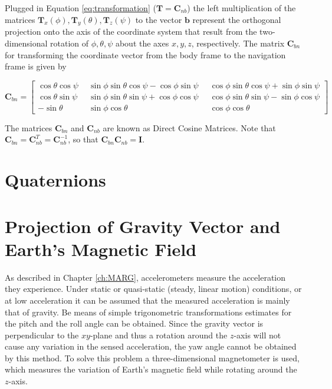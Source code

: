 \noindent
Plugged in Equation \ref{eq:transformation} ($\mathbf{T} = \mathbf{C}_{nb}$) the left multiplication of the matrices $\mathbf{T}_x(\phi), \mathbf{T}_y(\theta), \mathbf{T}_z(\psi)$ to the vector $\mathbf{b}$ represent the orthogonal projection onto the axis of the coordinate system that result from the two-dimensional rotation of $\phi, \theta, \psi$ about the axes $x, y, z$, respectively. The matrix $\mathbf{C}_{bn}$ for transforming the coordinate vector from the body frame to the navigation frame is given by

\begin{equation}
\mathbf{C}_{bn} = {\left[\begin{smallmatrix}
   \cos \theta \cos \psi \; &
    \sin \phi \sin \theta \cos \psi - \cos \phi \sin \psi \; &
    \cos \phi \sin \theta \cos \psi + \sin \phi \sin \psi \\
    \cos \theta \sin \psi \;\; &
    \sin \phi \sin \theta \sin \psi + \cos \phi \cos \psi \;\; &
    \cos \phi \sin \theta \sin \psi - \sin \phi \cos \psi \\
    -\sin \theta \;\; &
    \sin \phi \cos \theta \;\; &
    \cos \phi \cos \theta
  \end{smallmatrix}\right]}
\end{equation}

\noindent
The matrices $\mathbf{C}_{bn}$ and $\mathbf{C}_{nb}$ are known as Direct Cosine Matrices. Note that $\mathbf{C}_{bn} = \mathbf{C}^T_{nb} = \mathbf{C}^{-1}_{nb}$, so that $\mathbf{C}^{ }_{bn} \mathbf{C}_{nb} = \mathbf{I}$.  

\section{Quaternions}

\blindtext

\section{Projection of Gravity Vector and Earth's Magnetic Field}

As described in Chapter \ref{ch:MARG}, accelerometers measure the acceleration they experience. Under static or quasi-static (steady, linear motion) conditions, or at low acceleration it can be assumed that the measured acceleration is mainly that of gravity. Be means of simple trigonometric transformations estimates for the pitch and the roll angle can be obtained. Since the gravity vector is perpendicular to the $xy$-plane and thus a rotation around the $z$-axis will not cause any variation in the sensed acceleration, the yaw angle cannot be obtained by this method. To solve this problem a three-dimensional magnetometer is used, which measures the variation of Earth's magnetic field while rotating around the $z$-axis.

